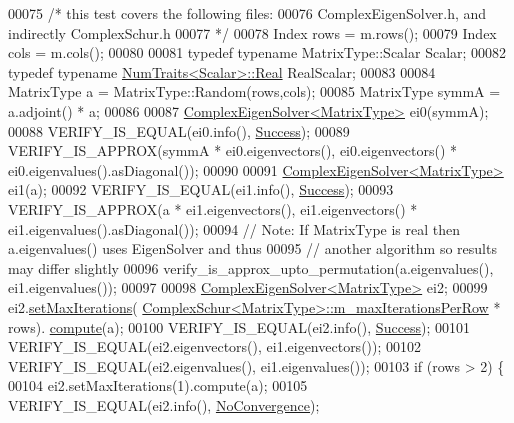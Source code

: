 \begin{DoxyCode}
00075   \textcolor{comment}{/* this test covers the following files:}
00076 \textcolor{comment}{     ComplexEigenSolver.h, and indirectly ComplexSchur.h}
00077 \textcolor{comment}{  */}
00078   Index rows = m.rows();
00079   Index cols = m.cols();
00080 
00081   \textcolor{keyword}{typedef} \textcolor{keyword}{typename} MatrixType::Scalar Scalar;
00082   \textcolor{keyword}{typedef} \textcolor{keyword}{typename} \hyperlink{group___core___module_struct_eigen_1_1_num_traits}{NumTraits<Scalar>::Real} RealScalar;
00083 
00084   MatrixType a = MatrixType::Random(rows,cols);
00085   MatrixType symmA =  a.adjoint() * a;
00086 
00087   \hyperlink{group___eigenvalues___module_class_eigen_1_1_complex_eigen_solver}{ComplexEigenSolver<MatrixType>} ei0(symmA);
00088   VERIFY\_IS\_EQUAL(ei0.info(), \hyperlink{group__enums_gga85fad7b87587764e5cf6b513a9e0ee5ea52581b035f4b59c203b8ff999ef5fcea}{Success});
00089   VERIFY\_IS\_APPROX(symmA * ei0.eigenvectors(), ei0.eigenvectors() * ei0.eigenvalues().asDiagonal());
00090 
00091   \hyperlink{group___eigenvalues___module_class_eigen_1_1_complex_eigen_solver}{ComplexEigenSolver<MatrixType>} ei1(a);
00092   VERIFY\_IS\_EQUAL(ei1.info(), \hyperlink{group__enums_gga85fad7b87587764e5cf6b513a9e0ee5ea52581b035f4b59c203b8ff999ef5fcea}{Success});
00093   VERIFY\_IS\_APPROX(a * ei1.eigenvectors(), ei1.eigenvectors() * ei1.eigenvalues().asDiagonal());
00094   \textcolor{comment}{// Note: If MatrixType is real then a.eigenvalues() uses EigenSolver and thus}
00095   \textcolor{comment}{// another algorithm so results may differ slightly}
00096   verify\_is\_approx\_upto\_permutation(a.eigenvalues(), ei1.eigenvalues());
00097 
00098   \hyperlink{group___eigenvalues___module_class_eigen_1_1_complex_eigen_solver}{ComplexEigenSolver<MatrixType>} ei2;
00099   ei2.\hyperlink{group___eigenvalues___module_a0c5a974da17774d75be41e351e6bda62}{setMaxIterations}(
      \hyperlink{group___eigenvalues___module_class_eigen_1_1_complex_schur}{ComplexSchur<MatrixType>::m\_maxIterationsPerRow} * rows).
      \hyperlink{group___eigenvalues___module_aeb7e38c6db5369f5c974f3786e94c1f0}{compute}(a);
00100   VERIFY\_IS\_EQUAL(ei2.info(), \hyperlink{group__enums_gga85fad7b87587764e5cf6b513a9e0ee5ea52581b035f4b59c203b8ff999ef5fcea}{Success});
00101   VERIFY\_IS\_EQUAL(ei2.eigenvectors(), ei1.eigenvectors());
00102   VERIFY\_IS\_EQUAL(ei2.eigenvalues(), ei1.eigenvalues());
00103   \textcolor{keywordflow}{if} (rows > 2) \{
00104     ei2.setMaxIterations(1).compute(a);
00105     VERIFY\_IS\_EQUAL(ei2.info(), \hyperlink{group__enums_gga85fad7b87587764e5cf6b513a9e0ee5eaba1c8763d1179778070f365ecc4157a8}{NoConvergence});

\end{DoxyCode}
